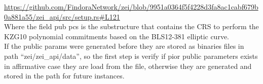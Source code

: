 \documentclass{article}
\begin{document}
\url{https://github.com/FindoraNetwork/zei/blob/9951a0364f5f4228d3fa8ac1cabf679b0a881a55/zei_api/src/setup.rs#L121}\\


Where the field pub pcs is the substructure that contains the CRS to perform the KZG10 polynomial commitments based on the BLS12-381 elliptic curve.\\

If the public params were generated before they are stored as binaries files in path “zei/zei\_api/data”, so the first step is verify if pior public parameters exists in affirmative case they are load from the file, otherwise they are generated and stored in the path for future instances.\\  
\end{document}
